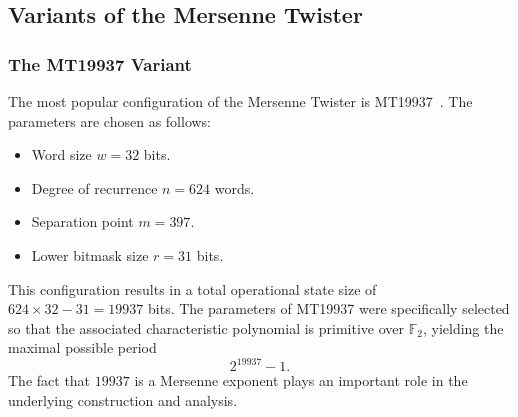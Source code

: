 \subsection{Variants of the Mersenne Twister}

\subsubsection{The MT19937 Variant}
The most popular configuration of the Mersenne Twister is MT19937~\cite{matsumoto1998mersenne}. The parameters are chosen as follows:
\begin{itemize}
    \item Word size $w = 32$ bits.
    \item Degree of recurrence $n = 624$ words.
    \item Separation point $m = 397$.
    \item Lower bitmask size $r = 31$ bits.
\end{itemize}
This configuration results in a total operational state size of $624 \times 32 - 31 = 19937$ bits. The parameters of MT19937 were specifically selected so that the associated characteristic polynomial is primitive over $\mathbb{F}_2$, yielding the maximal possible period
\[
2^{19937} - 1.
\]
The fact that $19937$ is a Mersenne exponent plays an important role in the underlying construction and analysis.



